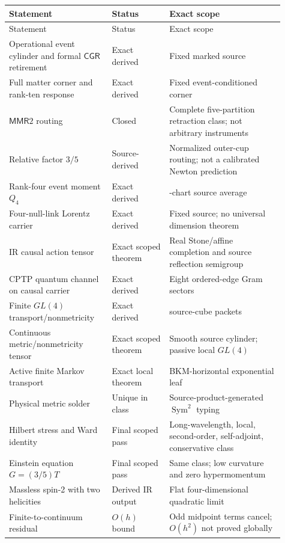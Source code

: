 \documentclass[11pt]{article}
\theoremstyle{definition}
\theoremstyle{remark}
\newcommand{\Sym}{\operatorname{Sym}}
\newcommand{\MMR}{\mathsf{MMR}}
\newcommand{\CGR}{\mathsf{CGR}}
\begin{document}
\begin{longtable}{>{\raggedright\arraybackslash}p{0.34\linewidth} >{\raggedright\arraybackslash}p{0.19\linewidth} >{\raggedright\arraybackslash}p{0.38\linewidth}}
\toprule
Statement & Status & Exact scope \\
\midrule
\endfirsthead
\toprule
Statement & Status & Exact scope \\
\midrule
\endhead
Operational event cylinder and formal $\CGR$ retirement & Exact derived & Fixed marked source \\
Full matter corner and rank-ten response & Exact derived & Fixed event-conditioned corner \\
$\MMR2$ routing & Closed & Complete five-partition retraction class; not arbitrary instruments \\
Relative factor $3/5$ & Source-derived & Normalized outer-cup routing; not a calibrated Newton prediction \\
Rank-four event moment $Q_4$ & Exact derived & 24-chart source average \\
Four-null-link Lorentz carrier & Exact derived & Fixed source; no universal dimension theorem \\
IR causal action tensor & Exact scoped theorem & Real Stone/affine completion and source reflection semigroup \\
CPTP quantum channel on causal carrier & Exact derived & Eight ordered-edge Gram sectors \\
Finite $GL(4)$ transport/nonmetricity & Exact derived & 48 source-cube packets \\
Continuous metric/nonmetricity tensor & Exact scoped theorem & Smooth source cylinder; passive local $GL(4)$ \\
Active finite Markov transport & Exact local theorem & BKM-horizontal exponential leaf \\
Physical metric solder & Unique in class & Source-product-generated $\Sym^2$ typing \\
Hilbert stress and Ward identity & Final scoped pass & Long-wavelength, local, second-order, self-adjoint, conservative class \\
Einstein equation $G=(3/5)T$ & Final scoped pass & Same class; low curvature and zero hypermomentum \\
Massless spin-2 with two helicities & Derived IR output & Flat four-dimensional quadratic limit \\
Finite-to-continuum residual & $O(h)$ bound & Odd midpoint terms cancel; $O(h^2)$ not proved globally \\

\end{longtable}
\end{document}
